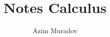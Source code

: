 \documentclass[12pt,a4paper,titlepage]{article}
\title{Notes Calculus}
\author{Azim Muradov}
\begin{document}
\maketitle
\blindtext
\end{document}
